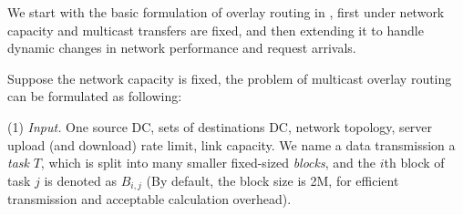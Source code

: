 
We start with the basic formulation of overlay routing in \name,
first under network capacity and multicast
transfers are fixed, and then extending it to
handle dynamic changes in network performance and request arrivals.

Suppose the network capacity is fixed, the problem of multicast
overlay routing can be formulated as following:


\noindent(1) {\em Input.}
One source DC, sets of destinations DC,
network topology,
server upload (and download) rate limit,
link capacity.
We name a data transmission a {\em task} $T$, which is split into
many smaller fixed-sized {\em blocks}, and the $i$th block of task $j$ is denoted as $B_{i,j}$ (By default, the block size is 2M, for efficient transmission and acceptable calculation overhead).

